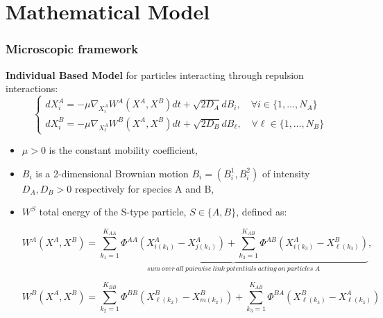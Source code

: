 \documentclass[10pt]{beamer}
\def \l {{\ell}}
\def \PAA {{\Phi^{AA}}}
\def \PBB {{\Phi^{BB}}}
\def \PAB {{\Phi^{AB}}}
\def \PBA {{\Phi^{BA}}}
\newcommand\Fontvii{\fontsize{9}{7.2}\selectfont}
\begin{document}
\section{Mathematical Model}
\begin{frame}
\frametitle{Microscopic framework}
\Fontvii

\textbf{Individual Based Model} for particles interacting through repulsion interactions:
\begin{equation}
	\begin{cases}
d X_i^{A}=-\mu \nabla_{X_{i}^{A}}W^{A}(X^{A},X^{B})dt + \sqrt{2D_{A}} d B_{i}, \quad \forall i \in\{1, \dots, N_{A}\}
\\
d X_i^{B}=-\mu \nabla_{X_{\l}^{A}}W^{B}(X^{A},X^{B})dt + \sqrt{2D_{B}} d B_{\ell}, \quad \forall \l \in \{1, \dots, N_{B}\}
\end{cases}
\end{equation}
\begin{itemize}
\item $\mu>0$ is the constant mobility coefficient, 
\item  $B_i$ is a 2-dimensional Brownian motion $B_i=(B_i^1,B_i^2)$ of intensity $D_A,D_B>0$ respectively for species A and B,
\item $W^S$ total energy of the S-type particle, $S \in \{ A,B \}$, defined as:  

 $$ W^{A}(X^{A},X^{B})=\underbrace{\sum_{k_1=1}^{K_{AA}} \PAA(X^{A}_{i(k_1)}-X^{A}_{j(k_1)})+
\sum_{k_3=1}^{K_{AB}} \PAB(X^{A}_{i(k_3)}-X^{B}_{\l(k_3)})}_{sum \ over \ all \ pairwise \ link \ potentials \ acting \ on \ particles \ A},  $$

$$ W^{B}(X^{A},X^{B})=\sum_{k_2=1}^{K_{BB}} \PBB(X^{B}_{\l(k_2)}-X^{B}_{m(k_2)})+
\sum_{k_3=1}^{K_{AB}} \PBA(X^{B}_{\l(k_3)}-X^{A}_{\l(k_3)}) $$

\end{itemize}
\end{frame}
\end{document}
